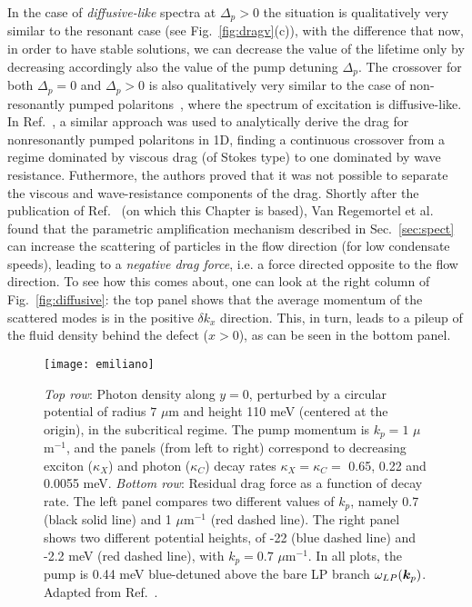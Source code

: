 In the case of \emph{diffusive-like} spectra at $\Delta_p>0$ the
situation is qualitatively very similar to the resonant case (see
Fig.~\ref{fig:dragv}(c)), with the difference that now, in order to
have stable solutions, we can decrease the value of the lifetime only
by decreasing accordingly also the value of the pump detuning
$\Delta_p$. The crossover for both $\Delta_p = 0$ and $\Delta_p > 0$
is also qualitatively very similar to the case of non-resonantly
pumped polaritons~\cite{Wouters_2010}, where the spectrum of
excitation is diffusive-like. In Ref.~\cite{Larr__2012}, a similar
approach was used to analytically derive the drag for nonresonantly
pumped polaritons in 1D, finding a continuous crossover from a regime
dominated by viscous drag (of Stokes type) to one dominated by wave
resistance. Futhermore, the authors proved that it was not possible to
separate the viscous and wave-resistance components of the drag.
Shortly after the publication of Ref.~\cite{Berceanu_2012} (on which
this Chapter is based), Van Regemortel et
al.~\cite{Van_Regemortel_2014} found that the parametric amplification
mechanism described in Sec.~\ref{sec:spect} can increase the
scattering of particles in the flow direction (for low condensate
speeds), leading to a \emph{negative drag force}, i.e. a force
directed opposite to the flow direction. To see how this comes about,
one can look at the right column of Fig.~\ref{fig:diffusive}: the top
panel shows that the average momentum of the scattered modes is in the
positive $\delta k_x$ direction. This, in turn, leads to a pileup of
the fluid density behind the defect ($x > 0$), as can be seen in the
bottom panel.

\begin{figure}[tb]\centering
  \texttt{[image: emiliano]}
  \caption{
    \emph{Top row}: Photon density along $y=0$, perturbed by a
    circular potential of radius $7$ $\mu$m and height 110 meV (centered
    at the origin), in the subcritical regime. The pump momentum is $k_p =
    1$ $\mu$m${}^{-1}$, and the panels (from left to right) correspond to
    decreasing exciton ($\kappa_X$) and photon ($\kappa_C$) decay rates
    $\kappa_X = \kappa_C =$ 0.65, 0.22 and 0.0055 meV. 
    \emph{Bottom row}: Residual drag force as a function of decay
    rate. The left panel compares two different values of $k_p$, namely
    0.7 (black solid line) and 1 $\mu$m${}^{-1}$ (red dashed line). The
    right panel shows two different potential heights, of -22 (blue
    dashed line) and -2.2 meV (red dashed line), with $k_p = 0.7$
    $\mu$m${}^{-1}$.
    In all plots, the pump is 0.44 meV blue-detuned above the bare LP
    branch $\omega_{LP}(\bm{k}_{p})$. Adapted from
    Ref.~\cite{Cancellieri_2010}.
  }\label{fig:emiliano}
\end{figure}

